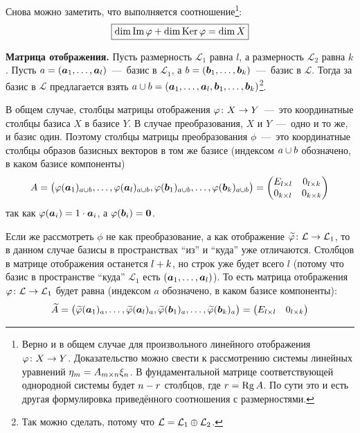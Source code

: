 \documentclass[a4paper,12pt]{article}
\DeclareMathOperator{\Imag}{Im}
\begin{document}
\begin{solution}
    Снова можно заметить, что выполняется соотношение\footnote{Верно и в общем случае для произвольного линейного отображения $\phi \colon X \hm\to Y$. Доказательство можно свести к рассмотрению системы линейных уравнений $\eta_m \hm= A_{m\times n} \xi_n$. В фундаментальной матрице соответствующей однородной системы будет $n \hm- r$ столбцов, где $r \hm= \Rg A$. По сути это и есть другая формулировка приведённого соотношения с размерностями.}:
    \[
      \boxed{\dim\Imag\phi + \dim\Ker\phi = \dim X}
    \]
    
    \medskip
    
    \textbf{Матрица отображения.} Пусть размерность $\mathcal L_1$ равна $l$, а размерность $\mathcal L_2$ равна $k$.
    Пусть $a \hm= (\bds a_1, \ldots, \bds a_l)$~---~базис в $\mathcal L_1$, а $b \hm= (\bds b_1, \ldots, \bds b_k)$~---~базис в $\mathcal L$.
    Тогда за базис в $\mathcal L$ предлагается взять $a \hm\cup b \hm= (\bds a_1, \ldots, \bds a_l, \bds b_1, \ldots, \bds b_k)$\footnote{Так можно сделать, потому что $\mathcal L \hm= \mathcal L_1 \hm\oplus \mathcal L_2$.}.
    
    В общем случае, столбцы матрицы отображения $\phi\colon X \hm\to Y$~---~это координатные столбцы базиса $X$ в базисе $Y$.
    В случае преобразования, $X$ и $Y$~---~одно и то же, и базис один.
    Поэтому столбцы матрицы преобразования $\phi$~---~это координатные столбцы образов базисных векторов в том же базисе (индексом $a \hm\cup b$ обозначено, в каком базисе компоненты)
    \[
      A = \bigl(\varphi(\boldsymbol a_1)_{a \cup b}, \ldots, \varphi(\boldsymbol a_l)_{a \cup b}, \varphi(\boldsymbol b_1)_{a \cup b}, \ldots, \varphi(\boldsymbol b_k)_{a \cup b}\bigr)
      = \begin{pmatrix}
        E_{l \times l} & 0_{l \times k}\\
        0_{k \times l} & 0_{k \times k}
      \end{pmatrix}
    \]
    так как $\phi(\bds a_i) \hm= 1 \hm\cdot \bds a_i$, а $\phi(\bds b_i) \hm= \bds 0$.
    
    Если же рассмотреть $\phi$ не как преобразование, а как отображение $\widetilde\phi\colon \mathcal L \hm\to \mathcal L_1$, то в данном случае базисы в пространствах ``из'' и ``куда'' уже отличаются.
    Столбцов в матрице отображения останется $l \hm+ k$, но строк уже будет всего $l$ (потому что базис в пространстве ``куда'' $\mathcal L_1$ есть $(\boldsymbol a_1, \ldots, \boldsymbol a_l)$).
    То есть матрица отображения $\phi\colon \mathcal L \hm\to \mathcal L_1$ будет равна (индексом $a$ обозначено, в каком базисе компоненты):
    \[
      \widetilde A = \bigl(\widetilde{\varphi}(\boldsymbol a_1)_{a}, \ldots, \widetilde{\varphi}(\boldsymbol a_l)_{a}, \widetilde{\varphi}(\boldsymbol b_1)_{a}, \ldots, \widetilde{\varphi}(\boldsymbol b_k)_{a}\bigr)
      = \begin{pmatrix}
        E_{l \times l} & 0_{l \times k}
      \end{pmatrix}
    \]
  \end{solution}
\end{document}

